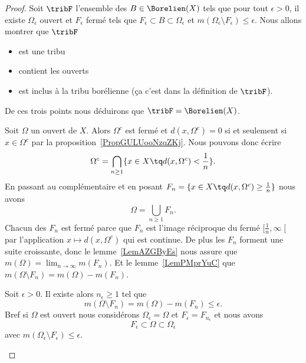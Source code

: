 \begin{proof}
	Soit \( \tribF\) l'ensemble des \( B\in\Borelien(X)\) tels que pour tout \( \epsilon>0\), il existe \( \Omega_{\epsilon}\) ouvert et \( F_{\epsilon}\) fermé tels que \( F_{\epsilon}\subset B\subset \Omega_{\epsilon}\) et \( m(\Omega_{\epsilon}\setminus F_{\epsilon})\leq \epsilon\). Nous allons montrer que \( \tribF\)
	\begin{itemize}
		\item est une tribu
		\item contient les ouverts
		\item est inclus à la tribu borélienne (ça c'est dans la définition de \( \tribF\)).
	\end{itemize}
	De ces trois points nous déduirons que \( \tribF=\Borelien(X)\).
	\begin{subproof}
		Soit \( \Omega\) un ouvert de \( X\). Alors \( \Omega^c\) est fermé et \( d(x,\Omega^c)=0\) si et seulement si \( x\in \Omega^c\) par la proposition~\ref{PropGULUooNzqZKj}. Nous pouvons donc écrire
		\begin{equation}
			\Omega^c=\bigcap_{n\geq 1}\{ x\in X\tq d(x,\Omega^c)<\frac{1}{ n } \}.
		\end{equation}
		En passant au complémentaire et en posant \( F_n=\{ x\in X\tq d(x,\Omega^c)\geq \frac{1}{ n } \}\) nous avons
		\begin{equation}
			\Omega=\bigcup_{n\geq 1}F_n.
		\end{equation}
		Chacun des \( F_n\) est fermé parce que \( F_n\) est l'image réciproque du fermé \( \mathopen[ \frac{1}{ n } , \infty \mathclose[\) par l'application \( x\mapsto d(x,\Omega^c)\) qui est continue. De plus les \( F_n\) forment une suite croissante, donc le lemme~\ref{LemAZGByEs} nous assure que \( m(\Omega)=\lim_{n\to \infty}m(F_n)\). Et le lemme~\ref{LemPMprYuC} que \( m(\Omega\setminus F_n)=m(\Omega)-m(F_n)\).

		Soit \( \epsilon>0\). Il existe alors \( n_{\epsilon}\geq 1\) tel que
		\begin{equation}
			m(\Omega\setminus F_n)=m(\Omega)-m(F_n)\leq \epsilon.
		\end{equation}
		Bref si \( \Omega\) est ouvert nous considérons \( \Omega_{\epsilon}=\Omega\) et \( F_{\epsilon}=F_{n_{\epsilon}}\) et nous avons
		\begin{equation}
			F_{\epsilon}\subset \Omega\subset \Omega_{\epsilon}
		\end{equation}
		avec \( m(\Omega_{\epsilon}\setminus F_{\epsilon})\leq \epsilon\).


\end{subproof}
\end{proof}
